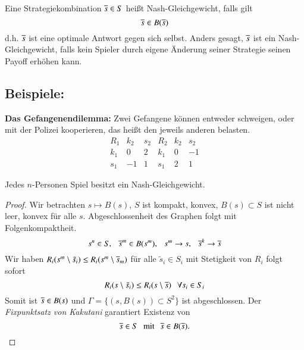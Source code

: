 \begin{defi}
    Eine Strategiekombination $\overline s\in S$ heißt Nash-Gleichgewicht, falls gilt
    \[
        \overline s \in B(\overline s)
    \]
    d.h. $\overline s$ ist eine optimale Antwort gegen sich selbst. Anders gesagt, $\overline s$ ist ein 
    Nash-Gleichgewicht, falls kein Spieler durch eigene Änderung seiner Strategie seinen Payoff erhöhen
    kann.
\end{defi}

\subsection*{Beispiele:}

    \textbf{Das Gefangenendilemma:}
    Zwei Gefangene können entweder schweigen, oder mit der Polizei kooperieren, das heißt den jeweils
    anderen belasten.
    \[
        \begin{array}{c|cc||c|cc} R_1& k_2& s_2& R_2&k_2&s_2\\ \hline k_1&0&2&k_1&0&-1\\
            s_1&-1&1&s_1&2&1\end{array}
    \]
\begin{theorem}\label{2.18}
    Jedes $n$-Personen Spiel besitzt ein Nash-Gleichgewicht.
\end{theorem}

\begin{proof}
    Wir betrachten $s\mapsto B(s)$, $S$ ist kompakt, konvex, $B(s)\subset S$ ist nicht leer, konvex für
    alle $s$. Abgeschlossenheit des Graphen folgt mit Folgenkompaktheit.
    \[
        s^n\in S, \hspace{.25cm} \overline s^m\in B(s^m), \hspace{.25cm} s^m\rightarrow s, \hspace{.25cm} \overline s^k\rightarrow \overline s
    \]
    Wir haben $R_i(s^m\setminus \tilde s_i)\leq R_i(s^m\setminus \overline s_m)$ für alle $\tilde s_i \in S_i$
    mit Stetigkeit von $R_i$ folgt sofort
    \[
        R_i(s\setminus \tilde s_i) \leq R_i(s\setminus \overline s) \hspace{.25cm} \forall s_i\in S_i
    \]
    Somit ist $\overline s \in B(s)$ und $\Gamma= \{ (s,B(s))\subset S^2 \}$ ist abgeschlossen.
    Der \textit{Fixpunktsatz von Kakutani} garantiert Existenz von
    \[
        \overline s\in S \hspace{.25cm} \text{mit} \hspace{.25cm} \overline s \in B(\overline s).
    \]
\end{proof}
